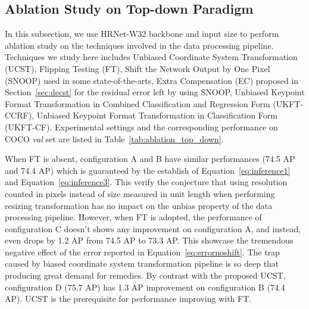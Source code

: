 \documentclass[10pt,journal,compsoc]{IEEEtran}
\begin{document}
\subsection{Ablation Study on Top-down Paradigm}
In this subsection, we use HRNet-W32 backbone and  input size to perform ablation study on the techniques involved in the data processing pipeline. Techniques we study here includes Unbiased Coordinate System Transformation (UCST), Flipping Testing (FT), Shift the Network Output by One Pixel (SNOOP) used in some state-of-the-arts\cite{SBNet,HRNet,DARK}, Extra Compensation (EC) proposed in Section~\ref{sec:decst} for the residual error left by using SNOOP, Unbiased Keypoint Format Transformation in Combined Classification and Regression Form (UKFT-CCRF), Unbiased Keypoint Format Transformation in Classification Form (UKFT-CF). Experimental settings and the corresponding performance on COCO \textit{val} set are listed in Table~\ref{tab:ablation_top_down}.

When FT is absent, configuration A and B have similar performances (74.5 AP and 74.4 AP) which is guaranteed by the establish of Equation~\ref{eq:inference1} and Equation~\ref{eq:inference3}. This verify the conjecture that using resolution counted in pixels instead of size measured in unit length when performing resizing transformation has no impact on the unbias property of the data processing pipeline. However, when FT is adopted, the performance of configuration C doesn't shows any improvement on configuration A, and instead, even drops by 1.2 AP from 74.5 AP to 73.3 AP. This showcase the tremendous negative effect of the error  reported in Equation~\ref{eq:errornoshift}. The trap caused by biased coordinate system transformation pipeline is so deep that producing great demand for remedies. By contrast with the proposed UCST, configuration D (75.7 AP) has 1.3 AP improvement on configuration B (74.4 AP). UCST is the prerequisite for performance improving with FT.
\end{document}
